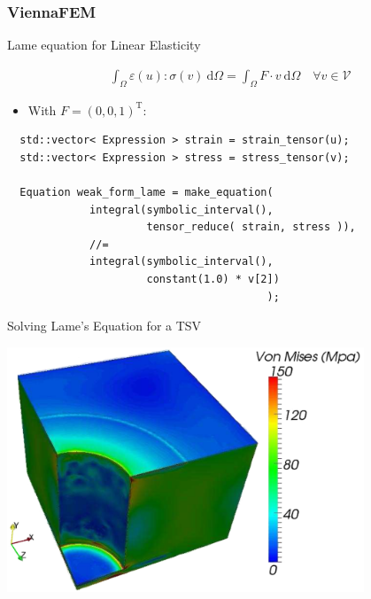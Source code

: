 \begin{frame}[fragile]
\frametitle{ViennaFEM}

 \begin{block}{Lame equation for Linear Elasticity}

  \begin{align*} 
    \int_\Omega \varepsilon(u) : \sigma(v) \: \mathrm{d} \Omega =
    \int_\Omega F \cdot v \: \mathrm{d} \Omega \quad \forall v \in \mathcal{V}
  \end{align*}

   \begin{itemize}
    \item With $F = (0, 0, 1)^{\mathrm{T}}$:
   \end{itemize}
   
  \begin{lstlisting}
  std::vector< Expression > strain = strain_tensor(u);
  std::vector< Expression > stress = stress_tensor(v);
  
  Equation weak_form_lame = make_equation(
             integral(symbolic_interval(),
                      tensor_reduce( strain, stress )),
             //=                                         
             integral(symbolic_interval(),
                      constant(1.0) * v[2])
                                         );
  \end{lstlisting}
   

 \end{block}

\end{frame}

\begin{frame}{Solving Lame's Equation for a TSV}
 \begin{center}
  \includegraphics[width=0.8\textwidth]{figures/tsv.png}
 \end{center}
\end{frame}


